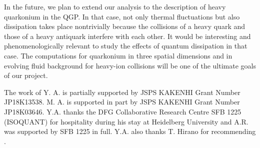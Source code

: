 \documentclass[prd,11pt, amsmath, amsymb, aps, reprint, tightenlines, nofootinbib, longbibliography, abbrv, preprintnumbers]{revtex4-1}
\begin{document}
In the future, we plan to extend our analysis to the description of heavy quarkonium in the QGP.
In that case, not only thermal fluctuations but also dissipation takes place nontrivially because the collisions of a heavy quark and those of a heavy antiquark interfere with each other.
It would be interesting and phenomenologically relevant to study the effects of quantum dissipation in that case.
The computations for quarkonium in three spatial dimensions and in evolving fluid background for heavy-ion collisions will be one of the ultimate goals of our project.

\begin{acknowledgments}
The work of Y. A. is partially supported by JSPS KAKENHI Grant Number JP18K13538. M. A. is supported in part by JSPS KAKENHI Grant Number JP18K03646.
Y.A. thanks the DFG Collaborative Research Centre SFB 1225 (ISOQUANT) for hospitality during his stay at Heidelberg University and A.R. was supported by SFB 1225 in full.
Y.A. also thanks T. Hirano for recommending \cite{percival1998quantum}.
\end{acknowledgments}


\ \\

\appendix
\end{document}
